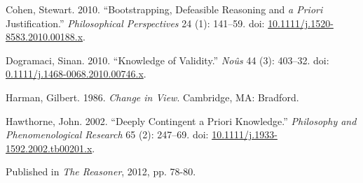 \documentclass[
  10pt,
  letterpaper,
  DIV=11,
  numbers=noendperiod,
  twoside]{scrartcl}
\newlength{\cslhangindent}
\newenvironment{CSLReferences}[2] %
 {\begin{list}{}{%
  \setlength{\itemindent}{0pt}
  \setlength{\leftmargin}{0pt}
  \setlength{\parsep}{0pt}
  \ifodd #1
   \setlength{\leftmargin}{\cslhangindent}
   \setlength{\itemindent}{-1\cslhangindent}
  \fi
  \setlength{\itemsep}{#2\baselineskip}}}
 {\end{list}}
\begin{document}
\label{refs}
\begin{CSLReferences}{1}{0}
Cohen, Stewart. 2010. {``Bootstrapping, Defeasible Reasoning and \emph{a
Priori} Justification.''} \emph{Philosophical Perspectives} 24 (1):
141--59. doi:
\href{https://doi.org/10.1111/j.1520-8583.2010.00188.x}{10.1111/j.1520-8583.2010.00188.x}.

Dogramaci, Sinan. 2010. {``Knowledge of Validity.''} \emph{No{û}s} 44
(3): 403--32. doi:
\href{https://doi.org/0.1111/j.1468-0068.2010.00746.x}{0.1111/j.1468-0068.2010.00746.x}.

Harman, Gilbert. 1986. \emph{Change in View}. Cambridge, MA: Bradford.

Hawthorne, John. 2002. {``Deeply Contingent a Priori Knowledge.''}
\emph{Philosophy and Phenomenological Research} 65 (2): 247--69. doi:
\href{https://doi.org/10.1111/j.1933-1592.2002.tb00201.x}{10.1111/j.1933-1592.2002.tb00201.x}.

\end{CSLReferences}



\noindent Published in\emph{
The Reasoner}, 2012, pp. 78-80.
\end{document}
